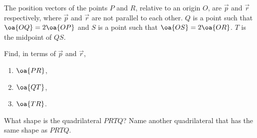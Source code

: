 \begin{problem}
    The position vectors of the points $P$ and $R$, relative to an origin $O$, are $\vec p$ and $\vec r$ respectively, where $\vec p$ and $\vec r$ are not parallel to each other. $Q$ is a point such that $\oa{OQ} = 2\oa{OP}$ and $S$ is a point such that $\oa{OS} = 2\oa{OR}$. $T$ is the midpoint of $QS$.

    Find, in terms of $\vec p$ and $\vec r$,
    \begin{enumerate}
        \item $\oa{PR}$,
        \item $\oa{QT}$,
        \item $\oa{TR}$.
    \end{enumerate}

    What shape is the quadrilateral $PRTQ$? Name another quadrilateral that has the same shape as $PRTQ$.
\end{problem}
